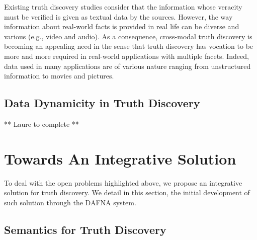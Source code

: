 \documentclass[prodmode,acmtecs]{acmsmall} %
\begin{document}
Existing truth discovery studies consider that the information whose veracity must be verified is given 
as textual data by the sources. However, the way information about real-world facts is provided in real 
life can be diverse and various (e.g., video and audio). As a consequence, cross-modal truth discovery 
is becoming an appealing need in the sense that truth discovery has vocation to be more and more required
in real-world applications with multiple facets.
Indeed, data used in many applications are of various nature ranging from unstructured information to movies
and pictures.


\subsection{Data Dynamicity in  Truth Discovery} 
** Laure to complete **

\section{Towards An Integrative Solution}
To deal with the open problems highlighted above, we propose an integrative solution for truth discovery.
We detail in this section, the initial development of such solution through the DAFNA system.

\subsection{Semantics for Truth Discovery} 
\end{document}
